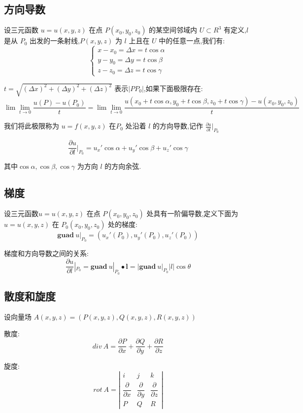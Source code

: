 \subsection{方向导数}
\begin{definition}[方向导数]
	
	设三元函数 $u=u(x,y,z)$ 在点 $P(x_{0},y_{0},z_{0})$ 的某空间邻域内 $U\subset R^3$ 有定义,$l$ 是从 $P_{0}$ 出发的一条射线,$P(x,y,z)$ 为 $l$ 上且在 $U$ 中的任意一点,我们有: 
	$$\left\lbrace \begin{array}{l}
		x-x_{0}=\Delta x=t\cos \alpha\\
		y-y_{0}=\Delta y=t\cos \beta\\
		z-z_{0}=\Delta z=t\cos \gamma
	\end{array}\right. $$ 
	
	$t=\sqrt{(\Delta x)^2+(\Delta y)^2+(\Delta z)^2}$ 表示$|PP_{0}|$,如果下面极限存在: 
	$$\lim\lim\limits_{t\rightarrow 0}\frac{u(P)-u(P_{0})}{t}=\lim\lim\limits_{t\rightarrow 0}\frac{u(x_{0}+t\cos \alpha,y_{0}+t\cos \beta,z_{0}+t\cos \gamma)-u(x_{0},y_{0},z_{0})}{t}$$
	
	我们将此极限称为 $u=f(x,y,z)$ 在$P_{0}$ 处沿着 $l$ 的方向导数,记作 $\frac{\partial u}{\partial l}|_{P_{0}}$
\end{definition}
\begin{theorem}[方向导数计算公式]
	$$\frac{\partial u}{\partial l}|_{P_{0}}=u_{x}'\cos \alpha+u_{y}'\cos \beta+u_{z}'\cos \gamma$$
	
	其中$\cos \alpha,\cos \beta,\cos \gamma$ 为方向 $l$ 的方向余弦.
\end{theorem}
\subsection{梯度}
\begin{definition}[梯度]
	
	设三元函数$u=u(x,y,z)$ 在点 $P(x_{0},y_{0},z_{0})$ 处具有一阶偏导数,定义下面为$u=u(x,y,z)$ 在 $ P_{0}(x_{0},y_{0},z_{0})$ 处的梯度: 
	$$\textbf{guad}\ u|_{P_{0}}=(u_{x}'(P_{0}),u_{y}'(P_{0}),u_{z}'(P_{0}))$$
	
	
	梯度和方向导数之间的关系: 
	$$\frac{\partial u}{\partial l}|_{P_{0}}=\textbf{guad}\ u|_{P_{0}}\bullet \textbf{l}=|\textbf{guad}\ u|_{P_{0}}|l|\cos \theta$$
\end{definition}
\subsection{散度和旋度}
\begin{definition}[散度和旋度]
	设向量场 $A(x,y,z)=(P(x,y,z),Q(x,y,z),R(x,y,z))$
	
	散度: 
	$$div\ A=\frac{\partial P}{\partial x}+\frac{\partial Q}{\partial y}+\frac{\partial R}{\partial z}$$
	
	旋度: 
	$$rot \ A=\left| \begin{array}{lll}
		i&j&k\\\dfrac{\partial}{\partial x}&\dfrac{\partial}{\partial y}&\dfrac{\partial}{\partial z}\\P&Q&R
	\end{array}\right| $$
\end{definition}
